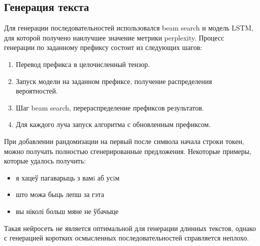 \subsection{Генерация текста}

Для генерации последовательностей использовался beam search и модель LSTM, для которой получено наилучшее значение метрики perplexity. Процесс генерации по заданному префиксу состоит из следующих шагов:

\begin{enumerate}
	\item Перевод префикса в целочисленный тензор.
	\item Запуск модели на заданном префиксе, получение распределения вероятностей.
	\item Шаг beam search, перераспределение префиксов результатов.
	\item Для каждого луча запуск алгоритма с обновленным префиксом.
\end{enumerate}

При добавлении рандомизации на первый после символа начала строки токен, можно получать полностью сгенерированные предложения. Некоторые примеры, которые удалось получить:

\begin{itemize}
	\item я хацеў пагаварыць з вамi аб усiм
	\item што можа быць лепш за гэта
	\item вы ніколі больш мяне не ўбачыце
\end{itemize}

Такая нейросеть не является оптимальной для генерации длинных текстов, однако с генерацией коротких осмысленных последовательностей справляется неплохо.
